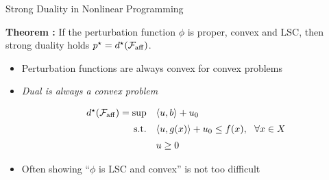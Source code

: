 \documentclass[9pt]{beamer}
\begin{document}
\begin{frame}{Strong Duality in Nonlinear Programming}

  \textbf{Theorem :} If the perturbation function $\phi$ is proper, convex and LSC, then strong duality holds $p^\star=d^\star(\mathcal{F}_{{\rm{aff}}})$.

  \vfill

  \begin{itemize}
  \item Perturbation functions are always convex for convex problems
  
  \item \emph{Dual is always a convex problem}

    \[
      \begin{array}{rl}
        d^\star(\mathcal{F}_{{\rm{aff}}}) = \sup & \left<u, b\right> + u_0 \\[0.5em]
        \mathrm{s.t.} & \left<u, g(x)\right>+ u_0 \leq f(x), ~~\forall x\in X \\[0.5em]
                                 & u\geq 0
      \end{array}
    \]
  \item<2-> Often showing ``$\phi$ is LSC and convex'' is not too difficult
  \end{itemize}
\end{frame}




      
\end{document}
